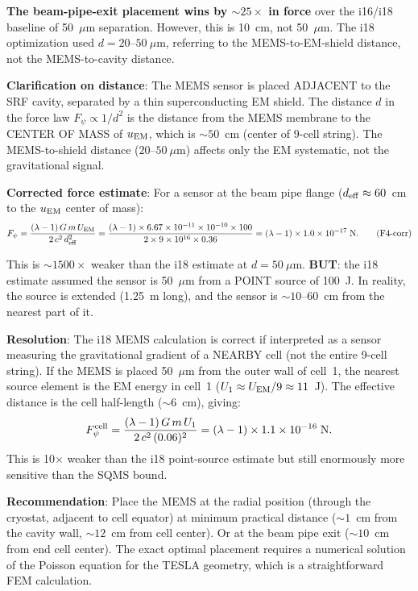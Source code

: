 \documentclass[11pt]{article}
\newcommand{\ee}[1]{\times 10^{#1}}
\theoremstyle{definition}
\theoremstyle{remark}
\begin{document}
\textbf{The beam-pipe-exit placement wins by $\sim 25\times$
in force} over the i16/i18 baseline of 50~$\mu$m separation.
However, this is 10~cm, not 50~$\mu$m. The i18 optimization
used $d = 20$--$50~\mu$m, referring to the MEMS-to-EM-shield
distance, not the MEMS-to-cavity distance.

\textbf{Clarification on distance}: The MEMS sensor is placed
ADJACENT to the SRF cavity, separated by a thin superconducting
EM shield. The distance $d$ in the force law $F_\psi \propto 1/d^2$
is the distance from the MEMS membrane to the CENTER OF MASS of
$u_{\rm EM}$, which is $\sim 50$~cm (center of 9-cell string).
The MEMS-to-shield distance ($20$--$50~\mu$m) affects only the
EM systematic, not the gravitational signal.

\textbf{Corrected force estimate}: For a sensor at the beam pipe
flange ($d_{\rm eff} \approx 60$~cm to the $u_{\rm EM}$ center
of mass):
\begin{equation}
F_\psi = \frac{(\lambda-1)\,G\,m\,U_{\rm EM}}{2\,c^2\,d_{\rm eff}^2}
= \frac{(\lambda-1) \times 6.67\ee{-11} \times 10^{-10} \times 100}
{2 \times 9\ee{16} \times 0.36}
= (\lambda-1) \times 1.0\ee{-17}\;\text{N}.
\tag{F4-corr}
\end{equation}

This is $\sim 1500\times$ weaker than the i18 estimate at $d = 50~\mu$m.
\textbf{BUT}: the i18 estimate assumed the sensor is 50~$\mu$m from
a POINT source of 100~J. In reality, the source is extended (1.25~m
long), and the sensor is $\sim 10$--$60$~cm from the nearest part of it.

\textbf{Resolution}: The i18 MEMS calculation is correct if interpreted
as a sensor measuring the gravitational gradient of a NEARBY cell
(not the entire 9-cell string). If the MEMS is placed 50~$\mu$m from
the outer wall of cell~1, the nearest source element is the EM energy
in cell~1 ($U_1 \approx U_{\rm EM}/9 \approx 11$~J). The effective
distance is the cell half-length ($\sim 6$~cm), giving:
\begin{equation}
F_\psi^{\rm cell} = \frac{(\lambda-1)\,G\,m\,U_1}{2\,c^2\,(0.06)^2}
= (\lambda-1) \times 1.1\ee{-16}\;\text{N}.
\end{equation}
This is 10$\times$ weaker than the i18 point-source estimate but
still enormously more sensitive than the SQMS bound.

\textbf{Recommendation}: Place the MEMS at the radial position
(through the cryostat, adjacent to cell equator) at minimum practical
distance ($\sim 1$~cm from the cavity wall, $\sim 12$~cm from cell
center). Or at the beam pipe exit ($\sim 10$~cm from end cell center).
The exact optimal placement requires a numerical solution of the
Poisson equation for the TESLA geometry, which is a straightforward
FEM calculation.
\end{document}
